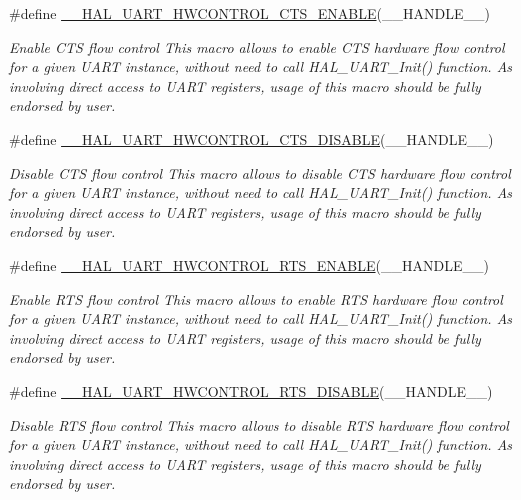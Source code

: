 \begin{DoxyCompactItemize}
\#define \mbox{\hyperlink{group___u_a_r_t___exported___macros_ga4a77213945844bca4c22ba6a14b7ee4c}{\+\_\+\+\_\+\+H\+A\+L\+\_\+\+U\+A\+R\+T\+\_\+\+H\+W\+C\+O\+N\+T\+R\+O\+L\+\_\+\+C\+T\+S\+\_\+\+E\+N\+A\+B\+LE}}(\+\_\+\+\_\+\+H\+A\+N\+D\+L\+E\+\_\+\+\_\+)
\begin{DoxyCompactList}\small\item\em Enable C\+TS flow control This macro allows to enable C\+TS hardware flow control for a given U\+A\+RT instance, without need to call H\+A\+L\+\_\+\+U\+A\+R\+T\+\_\+\+Init() function. As involving direct access to U\+A\+RT registers, usage of this macro should be fully endorsed by user. \end{DoxyCompactList}\item 
\#define \mbox{\hyperlink{group___u_a_r_t___exported___macros_ga0a26cb3a576c2700f76a7c697c86a499}{\+\_\+\+\_\+\+H\+A\+L\+\_\+\+U\+A\+R\+T\+\_\+\+H\+W\+C\+O\+N\+T\+R\+O\+L\+\_\+\+C\+T\+S\+\_\+\+D\+I\+S\+A\+B\+LE}}(\+\_\+\+\_\+\+H\+A\+N\+D\+L\+E\+\_\+\+\_\+)
\begin{DoxyCompactList}\small\item\em Disable C\+TS flow control This macro allows to disable C\+TS hardware flow control for a given U\+A\+RT instance, without need to call H\+A\+L\+\_\+\+U\+A\+R\+T\+\_\+\+Init() function. As involving direct access to U\+A\+RT registers, usage of this macro should be fully endorsed by user. \end{DoxyCompactList}\item 
\#define \mbox{\hyperlink{group___u_a_r_t___exported___macros_ga017ec9001ff33136f87cc4034b2709a6}{\+\_\+\+\_\+\+H\+A\+L\+\_\+\+U\+A\+R\+T\+\_\+\+H\+W\+C\+O\+N\+T\+R\+O\+L\+\_\+\+R\+T\+S\+\_\+\+E\+N\+A\+B\+LE}}(\+\_\+\+\_\+\+H\+A\+N\+D\+L\+E\+\_\+\+\_\+)
\begin{DoxyCompactList}\small\item\em Enable R\+TS flow control This macro allows to enable R\+TS hardware flow control for a given U\+A\+RT instance, without need to call H\+A\+L\+\_\+\+U\+A\+R\+T\+\_\+\+Init() function. As involving direct access to U\+A\+RT registers, usage of this macro should be fully endorsed by user. \end{DoxyCompactList}\item 
\#define \mbox{\hyperlink{group___u_a_r_t___exported___macros_ga8c034e96ad8f263cafeb5898ff7311fd}{\+\_\+\+\_\+\+H\+A\+L\+\_\+\+U\+A\+R\+T\+\_\+\+H\+W\+C\+O\+N\+T\+R\+O\+L\+\_\+\+R\+T\+S\+\_\+\+D\+I\+S\+A\+B\+LE}}(\+\_\+\+\_\+\+H\+A\+N\+D\+L\+E\+\_\+\+\_\+)
\begin{DoxyCompactList}\small\item\em Disable R\+TS flow control This macro allows to disable R\+TS hardware flow control for a given U\+A\+RT instance, without need to call H\+A\+L\+\_\+\+U\+A\+R\+T\+\_\+\+Init() function. As involving direct access to U\+A\+RT registers, usage of this macro should be fully endorsed by user. \end{DoxyCompactList}\item 

\end{DoxyCompactItemize}
